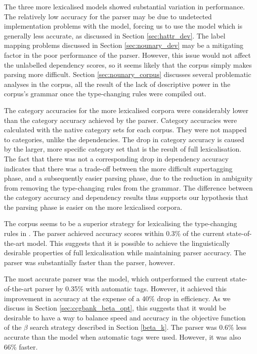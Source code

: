 The three more lexicalised models showed substantial variation in performance. The
relatively low accuracy for the \trsys parser may be due to undetected
implementation problems with the \hybrid model, forcing us to use the \derivs
model which is generally less accurate, as discussed in Section
\ref{sec:hattr_dev}. The label mapping problems discussed in Section
\ref{sec:nounary_dev} may be a mitigating factor in the \nounary poor
performance of the \nounary parser. However, this issue would not affect the
unlabelled dependency scores, so it seems likely that the \nounary corpus simply
makes parsing more difficult. Section \ref{sec:nounary_corpus} discusses several
problematic analyses in the \nounary corpus, all the result of the lack of
descriptive power in the corpus's grammar once the \ccgbank type-changing
rules were compiled out.

The category accuracies for the more lexicalised corpora were considerably lower than
the category accuracy achieved by the \ccgbank parser. Category accuracies were
calculated with the native category sets for each corpus. They were not mapped
to \ccgbank categories, unlike the dependencies. The drop in category accuracy
is caused by the larger, more specific category set that is the result of full
lexicalisation. The fact that there was not a corresponding drop in dependency
accuracy indicates that there was a trade-off between the more difficult
supertagging phase, and a subsequently easier parsing phase, due to the
reduction in ambiguity from removing the type-changing rules from the grammar. The
difference between the category accuracy and dependency results thus supports
our hypothesis that the parsing phase is easier on the more lexicalised corpora.

The \hatsys corpus seems to be a superior strategy for lexicalising the
type-changing rules in \ccgbank. The \hatsys parser achieved accuracy scores
within 0.3\% of the current state-of-the-art model. This suggests that it is
possible to achieve the linguistically desirable properties of full
lexicalisation while maintaining parser accuracy. The \hatsys parser was
substantially faster than the \ccgbank \hybrid parser, however.

The most accurate parser was the \ccgbank\hybrid\optbeta model, which
outperformed the current state-of-the-art parser by 0.35\% with automatic \pos
tags. However, it achieved this improvement in accuracy at the expense of a 40\%
drop in efficiency. As we discuss in Section \ref{sec:ccgbank_beta_opt}, this
suggests that it would be desirable to have a way to balance speed and accuracy
in the objective function of the $\beta$ search strategy described in Section
\ref{beta_k}.
The \hatsys\hybrid\optbeta parser was 0.6\% less accurate than
the \ccgbank\hybrid\optbeta model when automatic \pos tags were used.
However, it was also 66\% faster.

